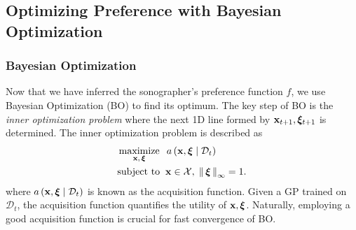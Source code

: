

\subsection{Optimizing Preference with Bayesian Optimization}\label{section:bo}
\subsubsection{Bayesian Optimization}
Now that we have inferred the sonographer's preference function \(f\), we use Bayesian Optimization (BO) to find its optimum.
The key step of BO is the \textit{inner optimization problem} where the next 1D line formed by \(\mathbf{x}_{t+1}, \bm{\xi}_{t+1}\) is determined.
The inner optimization problem is described as
%
\begin{align*}
 &\operatorname*{maximize}_{\mathbf{x},\, \bm{\xi}}\;\; a\,(\mathbf{x}, \bm{\xi} \mid \mathcal{D}_t) \\
 &\text{subject to}\;\; \mathbf{x} \in \mathcal{X},\; \left\lVert\, \bm{\xi} \,\right\rVert_{\infty} = 1.
\end{align*}
where \(a\,(\mathbf{x}, \bm{\xi} \mid \mathcal{D}_t)\) is known as the acquisition function.
Given a GP trained on \(\mathcal{D}_t\), the acquisition function quantifies the utility of \(\mathbf{x}, \bm{\xi}\).
Naturally, employing a good acquisition function is crucial for fast convergence of BO.

